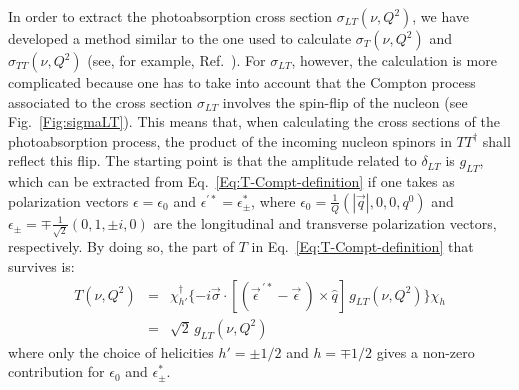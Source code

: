 \documentclass[twocolumn,prc,showpacs,nofootinbib,preprintnumbers,amsmath,amssymb,superscriptaddress]{revtex4-1}
\begin{document}
In order to extract the photoabsorption cross section $\sigma_{LT}(\nu,Q^2)$, we have developed a method similar to the one used to calculate $\sigma_T(\nu,Q^2)$ and $\sigma_{TT}(\nu,Q^2)$ (see, for example, Ref.~\cite{Holstein:2005db}). 
For $\sigma_{LT}$, however, the calculation is more complicated because one has to take into account that the Compton process associated to the cross section $\sigma_{LT}$ involves the spin-flip of the nucleon (see Fig.~\ref{Fig:sigmaLT}). This means that, when calculating the cross sections of the photoabsorption process, the product of the incoming nucleon spinors in $T T^\dagger$ shall reflect this flip. 
The starting point is that the amplitude related to $\delta_{LT}$ is $g_{LT}$, which can be extracted from Eq.~\eqref{Eq:T-Compt-definition} if one takes as polarization vectors $\epsilon=\epsilon_0$ and $\epsilon^{'*}=\epsilon^*_\pm$, where $\epsilon_0=\frac{1}{Q}(|\vec{q}|,0,0,q^0)$ and $\epsilon_{\pm}=\mp\frac{1}{\sqrt{2}}(0,1,\pm i , 0)$ are the longitudinal and transverse polarization vectors, respectively. 
By doing so, the part of $T$ in Eq.~\eqref{Eq:T-Compt-definition} that survives is: 
\begin{eqnarray}\label{Eq:Derivation-LT1}
T(\nu,Q^2)&=& \chi^\dagger_{h'} \{- i \vec{\sigma}\cdot [(\vec{\epsilon}^{\, \prime *} - \vec{\epsilon}\,)\times \hat{q}] \, g_{LT}(\nu,Q^2)\} \chi_h \nonumber\\
&=& \sqrt{2}\, g_{LT}(\nu,Q^2)
\end{eqnarray}
where only the choice of helicities $h'=\pm1/2$ and $h=\mp 1/2$  gives a non-zero contribution for $\epsilon_0$ and $\epsilon^*_\pm$. 
\end{document}
